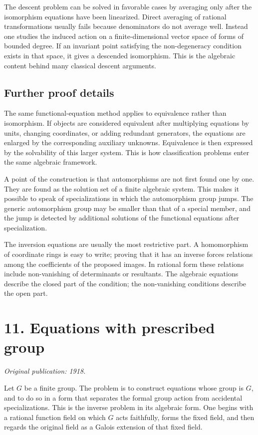 \documentclass[11pt]{article}
\begin{document}
The descent problem can be solved in favorable cases by averaging only after the isomorphism
equations have been linearized. Direct averaging of rational transformations usually fails because
denominators do not average well. Instead one studies the induced action on a finite-dimensional
vector space of forms of bounded degree. If an invariant point satisfying the non-degeneracy
condition exists in that space, it gives a descended isomorphism. This is the algebraic content
behind many classical descent arguments.


\subsection{Further proof details}

The same functional-equation method applies to equivalence rather than isomorphism. If objects are
considered equivalent after multiplying equations by units, changing coordinates, or adding
redundant generators, the equations are enlarged by the corresponding auxiliary unknowns.
Equivalence is then expressed by the solvability of this larger system. This is how classification
problems enter the same algebraic framework.

A point of the construction is that automorphisms are not first found one by one. They are found as
the solution set of a finite algebraic system. This makes it possible to speak of specializations in
which the automorphism group jumps. The generic automorphism group may be smaller than that of a
special member, and the jump is detected by additional solutions of the functional equations after
specialization.

The inversion equations are usually the most restrictive part. A homomorphism of coordinate rings is
easy to write; proving that it has an inverse forces relations among the coefficients of the
proposed images. In rational form these relations include non-vanishing of determinants or
resultants. The algebraic equations describe the closed part of the condition; the non-vanishing
conditions describe the open part.


\section{11. Equations with prescribed group}

\textit{Original publication: 1918.}

Let \(G\) be a finite group. The problem is to construct equations whose group is \(G\), and to do
so in a form that separates the formal group action from accidental specializations. This is the
inverse problem in its algebraic form. One begins with a rational function field on which \(G\) acts
faithfully, forms the fixed field, and then regards the original field as a Galois extension of that
fixed field.
\end{document}
